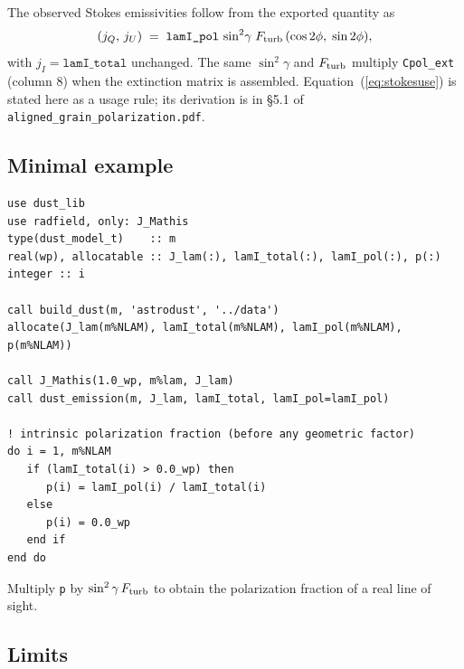 \documentclass{my_memo}
\newcommand{\code}[1]{\texttt{#1}}
\begin{document}
\noindent The observed Stokes emissivities follow from the exported quantity as
\begin{equation}
(j_Q,\,j_U) \;=\; \code{lamI\_pol}\,\sin^2\!\gamma\;F_{\rm turb}\,
                  (\cos 2\phi,\;\sin 2\phi),
\label{eq:stokesuse}
\end{equation}
with $j_I = \code{lamI\_total}$ unchanged. The same $\sin^2\gamma$ and
$F_{\rm turb}$ multiply \code{Cpol\_ext} (column 8) when the extinction matrix
is assembled.
Equation~(\ref{eq:stokesuse}) is stated here as a usage rule; its derivation is
in \S5.1 of \code{aligned\_grain\_polarization.pdf}.

\subsection{Minimal example}

\begin{lstlisting}
use dust_lib
use radfield, only: J_Mathis
type(dust_model_t)    :: m
real(wp), allocatable :: J_lam(:), lamI_total(:), lamI_pol(:), p(:)
integer :: i

call build_dust(m, 'astrodust', '../data')
allocate(J_lam(m%NLAM), lamI_total(m%NLAM), lamI_pol(m%NLAM), p(m%NLAM))

call J_Mathis(1.0_wp, m%lam, J_lam)
call dust_emission(m, J_lam, lamI_total, lamI_pol=lamI_pol)

! intrinsic polarization fraction (before any geometric factor)
do i = 1, m%NLAM
   if (lamI_total(i) > 0.0_wp) then
      p(i) = lamI_pol(i) / lamI_total(i)
   else
      p(i) = 0.0_wp
   end if
end do
\end{lstlisting}

\noindent Multiply \code{p} by $\sin^2\gamma\,F_{\rm turb}$ to obtain the
polarization fraction of a real line of sight.

\subsection{Limits}
\end{document}

